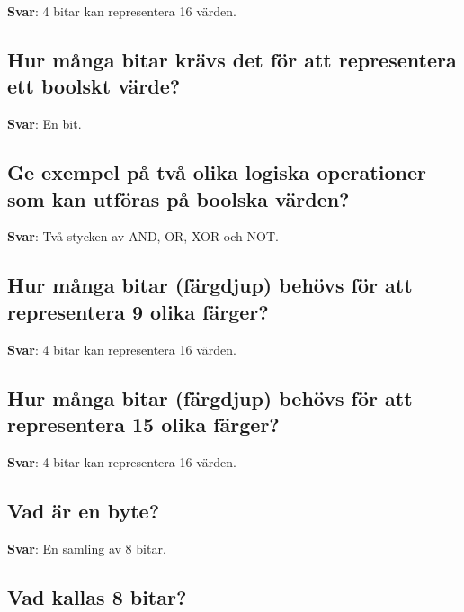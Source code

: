 \documentclass[a4paper,11pt,oneside]{article}
\begin{document}
\begin{sloppypar}
\label{q:86:sa:sv:True}

\textbf{Svar}: 4 bitar kan representera 16 v\"arden.



\subsection{Hur m\r{a}nga bitar kr\"avs det f\"or att representera ett boolskt v\"arde?}

\label{q:87:sa:sv:True}

\textbf{Svar}: En bit.



\subsection{Ge exempel p\r{a} tv\r{a} olika logiska operationer som kan utf\"oras p\r{a} boolska v\"arden?}

\label{q:88:sa:sv:True}

\textbf{Svar}: Tv\r{a} stycken av AND, OR, XOR och NOT.



\subsection{Hur m\r{a}nga bitar (f\"argdjup) beh\"ovs f\"or att representera 9 olika f\"arger?}

\label{q:89:sa:sv:True}

\textbf{Svar}: 4 bitar kan representera 16 v\"arden.



\subsection{Hur m\r{a}nga bitar (f\"argdjup) beh\"ovs f\"or att representera 15 olika f\"arger?}

\label{q:90:sa:sv:True}

\textbf{Svar}: 4 bitar kan representera 16 v\"arden.



\subsection{Vad \"ar en byte?}

\label{q:91:sa:sv:True}

\textbf{Svar}: En samling av 8 bitar.



\subsection{Vad kallas 8 bitar?}


\end{sloppypar}
\end{document}
